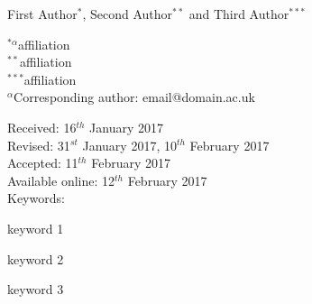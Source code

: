 \documentclass[paper=a4,fontsize=11pt,twocolumn]{article}
\begin{document}
		\Large{First Author$^{*}$, Second Author$^{**}$ and Third Author$^{***}$}	

		\setlength{\columnseprule}{1pt}
		\def\columnseprulecolor{\color{brand-secondary}}
		\begin{multicols}{2}
			\small{$^{*\alpha}$affiliation\smallskip\\
				$^{**}$affiliation\smallskip\\
				$^{***}$affiliation}\bigskip\smallskip\\
			\vfill
			\small{$^{\alpha}$Corresponding author: email@domain.ac.uk}
			\columnbreak

			\hangindent=0.8cm 
			\small{
				\hspace{8mm}Received: 16$^{th}$ January 2017\smallskip\\
				Revised: 31$^{st}$ January 2017, 10$^{th}$ February 2017\smallskip\\
				Accepted: 11$^{th}$ February 2017\smallskip\\
				Available online: 12$^{th}$ February 2017\bigskip\\
				\vfill
				\hspace{8mm}Keywords: \colorbox{brand-midlight}{\strut keyword 1} \colorbox{brand-midlight}{\strut keyword 2} \colorbox{brand-midlight}{\strut keyword 3}
				}
		\end{multicols}
		\bigskip		
\end{document}
